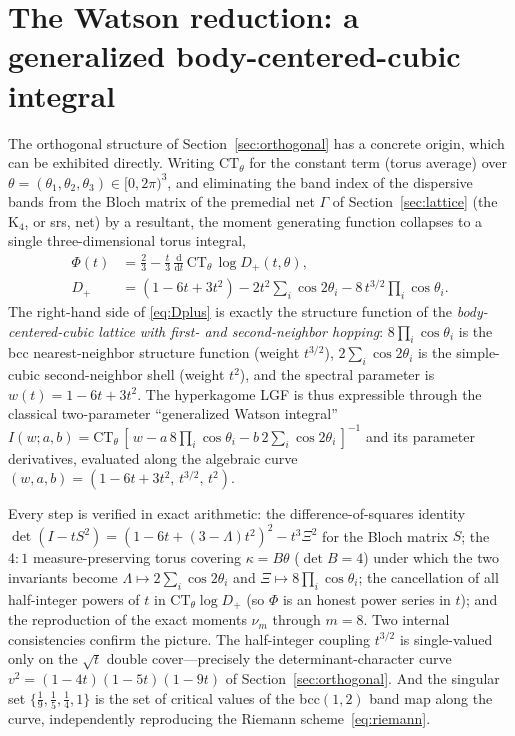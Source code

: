 \documentclass[11pt]{article}
\newcommand{\rmd}{\mathrm{d}}
\theoremstyle{plain}
\theoremstyle{remark}
\begin{document}
\section{The Watson reduction: a generalized body-centered-cubic integral}
\label{sec:watson}
The orthogonal structure of Section~\ref{sec:orthogonal} has a concrete origin, which can be exhibited directly.
Writing $\mathrm{CT}_\theta$ for the constant term (torus average) over $\theta=(\theta_1,\theta_2,\theta_3)\in
[0,2\pi)^3$, and eliminating the band index of the dispersive bands from the Bloch matrix of the premedial
net $\Gamma$ of Section~\ref{sec:lattice} (the $\mathrm{K}_4$, or srs, net) by a
resultant, the moment generating function collapses to a single three-dimensional torus integral,
\begin{equation}
\begin{split}
\Phi(t)&=\frac23-\frac t3\,\frac{\rmd}{\rmd t}\,\mathrm{CT}_\theta\,\log D_+(t,\theta),\\[2pt]
D_+&=(1-6t+3t^2)-2t^2\!\sum_{i}\cos2\theta_i-8\,t^{3/2}\!\prod_i\cos\theta_i .
\end{split}
\label{eq:Dplus}
\end{equation}
The right-hand side of \eqref{eq:Dplus} is exactly the structure function of the \emph{body-centered-cubic lattice
with first- and second-neighbor hopping}: $8\prod_i\cos\theta_i$ is the bcc nearest-neighbor structure function
(weight $t^{3/2}$), $2\sum_i\cos2\theta_i$ is the simple-cubic second-neighbor shell (weight $t^2$), and the
spectral parameter is $w(t)=1-6t+3t^2$. The hyperkagome LGF is thus expressible through the classical
two-parameter ``generalized Watson integral''
$I(w;a,b)=\mathrm{CT}_\theta\,[\,w-a\,8\!\prod_i\cos\theta_i-b\,2\!\sum_i\cos2\theta_i\,]^{-1}$ and its parameter
derivatives, evaluated along the algebraic curve $(w,a,b)=(1-6t+3t^2,\,t^{3/2},\,t^2)$.

Every step is verified in exact arithmetic: the difference-of-squares identity
$\det(I-tS^2)=(1-6t+(3-\Lambda)t^2)^2-t^3\Xi^2$ for the Bloch matrix $S$; the $4{:}1$ measure-preserving torus
covering $\kappa=B\theta$ ($\det B=4$) under which the two invariants become $\Lambda\mapsto2\sum_i\cos2\theta_i$ and
$\Xi\mapsto8\prod_i\cos\theta_i$; the cancellation of all half-integer powers of $t$ in
$\mathrm{CT}_\theta\log D_+$ (so $\Phi$ is an honest power series in $t$); and the reproduction of the exact moments
$\nu_m$ through $m=8$. Two internal consistencies confirm the picture. The half-integer coupling $t^{3/2}$ is
single-valued only on the $\sqrt t$ double cover---precisely the determinant-character curve
$v^2=(1-4t)(1-5t)(1-9t)$ of Section~\ref{sec:orthogonal}. And the singular set $\{\tfrac19,\tfrac15,\tfrac14,1\}$ is the
set of critical values of the bcc$(1,2)$ band map along the curve, independently reproducing the Riemann
scheme~\eqref{eq:riemann}.
\end{document}
